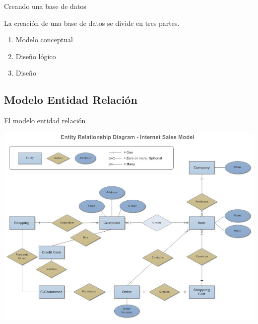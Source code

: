 \documentclass[11pt]{beamer}
\begin{document}
\begin{frame}{Creando una base de datos}

La creación de una base de datos se divide en tres partes.

\begin{enumerate}
\item Modelo conceptual

\item Diseño lógico

\item Diseño 
\end{enumerate}



\end{frame}



\subsection{Modelo Entidad Relación}


\begin{frame}{El modelo entidad relación}

\begin{center}
\includegraphics[scale=0.3]{images/erd.jpg} 

\end{center}

\end{frame}



\end{document}
